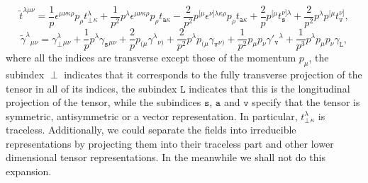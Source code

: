 \documentclass[aps,prd,12pt,twocolumn,superscriptaddress,showpacs,showkeys,reprint,longbibliography]{revtex4-1}
\renewcommand{\(}{\left(}
\renewcommand{\)}{\right)}
\renewcommand{\[}{\left[}
\renewcommand{\]}{\right]}
\begin{document}
\begin{dmath}
  \label{transverset}
  \tilde t^{\lambda\mu\nu}=\frac{1}{p}\epsilon^{\mu\nu\kappa\rho}p_\rho t_\perp^{\lambda}{}_\kappa+\frac{1}{p^2}p^\lambda\epsilon^{\mu\nu\kappa\rho}p_\rho t_{\texttt{a}\kappa}-\frac{2}{p^2}p^{[\mu}\epsilon^{\nu]\lambda\kappa\rho}p_\rho t_{\texttt{a}\kappa}+\frac{2}{p}p^{[\mu} t_{\texttt{s}}^{\nu]\lambda}+\frac{2}{p^2}p^\lambda p^{[\mu} t_{\texttt{v}}^{\nu]},
\end{dmath}
\begin{dmath}
  \label{transversegamma}
  \tilde \gamma^{\lambda}{}_{\mu\nu}=\gamma_\perp^{\lambda}{}_{\mu\nu}+\frac{1}{p}p^\lambda \gamma_{\texttt{s}}{}_{\mu\nu}+\frac{2}{p}p_{(\mu} \gamma^\lambda{}_{\nu)}+\frac{2}{p^2}p^\lambda p_{(\mu} \gamma_{\texttt{v}}{}_{\nu)}+ \frac{1}{p^2}p_{\mu} p_{\nu} \gamma'_{\texttt{v}}{}^\lambda+\frac{1}{p^3}p^\lambda p_{\mu} p_{\nu} \gamma_{\texttt{L}},
\end{dmath}
where all the indices are transverse except those of the momentum $p_\mu$, the subindex $\perp$ indicates that it corresponds to the fully transverse projection of the tensor in all of its indices, the subindex ${\texttt{L}}$ indicates that this is the longitudinal projection of the tensor, while the subindices $\texttt{s}$, $\texttt{a}$ and $\texttt{v}$ specify that the tensor is symmetric, antisymmetric or a vector representation. In particular, $t_\perp^{\lambda}{}_\kappa$ is traceless. Additionally, we could separate the fields into irreducible representations by projecting them into their traceless part and other lower dimensional tensor representations. In the meanwhile we shall not do this expansion.
\end{document}
